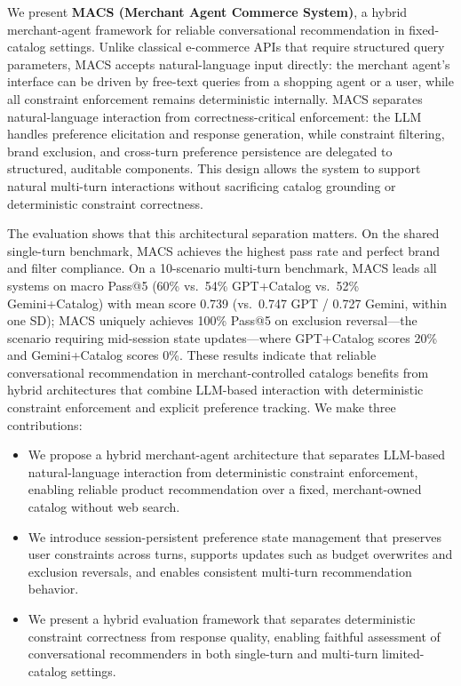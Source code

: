 \documentclass[sigconf,anonymous]{acmart}
\newcommand{\GPTCatalog}{GPT\allowbreak{}+\allowbreak{}Catalog}
\newcommand{\GeminiCatalog}{Gemini\allowbreak{}+\allowbreak{}Catalog}
\begin{document}
We present \textbf{MACS (Merchant Agent Commerce System)}, a hybrid
merchant-agent framework for reliable conversational recommendation in
fixed-catalog settings. Unlike classical e-commerce APIs that require
structured query parameters, MACS accepts natural-language input directly:
the merchant agent's interface can be driven by free-text queries from a
shopping agent or a user, while all constraint enforcement remains
deterministic internally. MACS separates natural-language interaction from
correctness-critical enforcement: the LLM handles preference elicitation
and response generation, while constraint filtering, brand exclusion, and
cross-turn preference persistence are delegated to structured, auditable
components. This design allows the system to support natural multi-turn
interactions without sacrificing catalog grounding or deterministic
constraint correctness.

The evaluation shows that this architectural separation matters. On the shared
single-turn benchmark, MACS achieves the highest pass rate and perfect brand and
filter compliance. On a 10-scenario multi-turn benchmark, MACS leads all systems
on macro Pass@5 (60\% vs.\ 54\% \GPTCatalog{} vs.\ 52\% \GeminiCatalog{}) with
mean score 0.739 (vs.\ 0.747 GPT / 0.727 Gemini, within one SD); MACS uniquely achieves 100\% Pass@5
on exclusion reversal---the scenario requiring mid-session state
updates---where \GPTCatalog{} scores 20\% and \GeminiCatalog{} scores 0\%.
These results indicate that reliable conversational recommendation in
merchant-controlled catalogs benefits from hybrid architectures that combine
LLM-based interaction with deterministic constraint enforcement and explicit
preference tracking. We make three contributions:
\begin{itemize}[leftmargin=*]
    \item We propose a hybrid merchant-agent architecture that separates
    LLM-based natural-language interaction from deterministic constraint
    enforcement, enabling reliable product recommendation over a fixed,
    merchant-owned catalog without web search.

    \item We introduce session-persistent preference state management that
    preserves user constraints across turns, supports updates such as budget
    overwrites and exclusion reversals, and enables consistent multi-turn
    recommendation behavior.

    \item We present a hybrid evaluation framework that separates deterministic
    constraint correctness from response quality, enabling faithful assessment
    of conversational recommenders in both single-turn and multi-turn
    limited-catalog settings.
\end{itemize}
\end{document}
